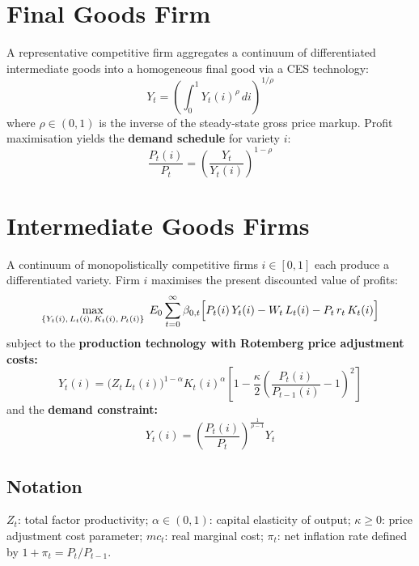 \documentclass[11pt, a4paper]{article}
\begin{document}
\section{Final Goods Firm}

A representative competitive firm aggregates a continuum of differentiated
intermediate goods into a homogeneous final good via a CES technology:
%
\begin{equation}
    Y_t = \left(\int_0^1 Y_t(i)^{\rho}\,di\right)^{1/\rho}
\end{equation}
%
where $\rho \in (0,1)$ is the inverse of the steady-state gross price markup.
Profit maximisation yields the \textbf{demand schedule} for variety $i$:
%
\begin{equation}
    \frac{P_t(i)}{P_t}
    = \left(\frac{Y_t}{Y_t(i)}\right)^{1-\rho}
    \label{eq:demand}
\end{equation}

\section{Intermediate Goods Firms}

A continuum of monopolistically competitive firms $i \in [0,1]$ each produce a
differentiated variety. Firm $i$ maximises the present discounted value of
profits:
%
\begin{equation}
    \max_{\{Y_t(i),\,L_t(i),\,K_t(i),\,P_t(i)\}}
    \;E_0\sum_{t=0}^{\infty} \beta_{0,t}
    \Bigl[P_t(i)\,Y_t(i) - W_t\,L_t(i) - P_t\,r_t\,K_t(i)\Bigr]
\end{equation}
%
subject to the \textbf{production technology with Rotemberg price adjustment
costs:}
\begin{equation}
    Y_t(i) = \bigl(Z_t\,L_t(i)\bigr)^{1-\alpha} K_t(i)^{\alpha}
    \left[1 - \frac{\kappa}{2}
    \left(\frac{P_t(i)}{P_{t-1}(i)} - 1\right)^{\!2}\right]
    \label{eq:production}
\end{equation}
%
and the \textbf{demand constraint:}
\begin{equation}
    Y_t(i) = \left(\frac{P_t(i)}{P_t}\right)^{\!\frac{1}{\rho-1}} Y_t
    \label{eq:demand_constraint}
\end{equation}

\subsection*{Notation}

$Z_t$: total factor productivity; $\alpha \in (0,1)$: capital elasticity of
output; $\kappa \geq 0$: price adjustment cost parameter; $mc_t$: real marginal
cost; $\pi_t$: net inflation rate defined by $1+\pi_t = P_t/P_{t-1}$.
\end{document}
